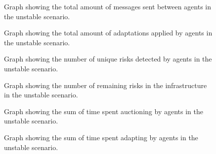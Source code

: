 \begin{figure}[H]
    \centering
    
    \caption{Graph showing the total amount of messages sent between agents in the unstable scenario.}
\end{figure}
\begin{figure}[H]
    \centering
    
    \caption{Graph showing the total amount of adaptations applied by agents in the unstable scenario.}
\end{figure}
\begin{figure}[H]
    \centering
        
    \caption{Graph showing the number of unique risks detected by agents in the unstable scenario.}
\end{figure}
\begin{figure}[H]
    \centering
        
    \caption{Graph showing the number of remaining risks in the infrastructure in the unstable scenario.}
\end{figure}
\begin{figure}[H]
    \centering
        
    \caption{Graph showing the sum of time spent auctioning by agents in the unstable scenario.}
\end{figure}
\begin{figure}[H]
    \centering
        
    \caption{Graph showing the sum of time spent adapting by agents in the unstable scenario.}
\end{figure}
